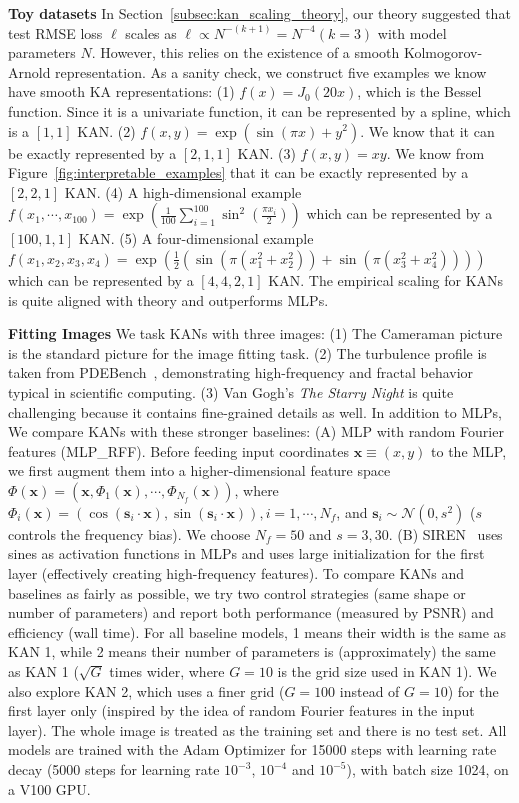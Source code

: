 \documentclass[12pt]{caltech_thesis}
\numberwithin{equation}{section}
\begin{document}
\textbf{Toy datasets} In Section~\ref{subsec:kan_scaling_theory}, our theory suggested that test RMSE loss $\ell$ scales as $\ell\propto N^{-(k+1)}=N^{-4} (k=3)$ with model parameters $N$. However, this relies on the existence of a smooth Kolmogorov-Arnold representation. As a sanity check, we construct five examples we know have smooth KA representations: (1) $f(x)=J_0(20x)$, which is the Bessel function. Since it is a univariate function, it can be represented by a spline, which is a $[1,1]$ KAN. (2) $f(x,y)={\exp}({\sin}(\pi x)+y^2)$. We know that it can be exactly represented by a $[2,1,1]$ KAN. (3) $f(x,y)=xy$. We know from Figure~\ref{fig:interpretable_examples} that it can be exactly represented by a $[2,2,1]$ KAN. (4) A high-dimensional example $f(x_1,\cdots,x_{100})={\exp}(\frac{1}{100}\sum_{i=1}^{100}{\sin}^2(\frac{\pi x_i}{2}))$ which can be represented by a $[100,1,1]$ KAN. (5) A four-dimensional example $f(x_1,x_2,x_3,x_4)={\exp}(\frac{1}{2}({\sin}(\pi(x_1^2+x_2^2))+{\sin}(\pi(x_3^2+x_4^2))))$ which can be represented by a $[4,4,2,1]$ KAN. The empirical scaling for KANs is quite aligned with theory and outperforms MLPs.

\textbf{Fitting Images} We task KANs with three images: (1) The Cameraman picture is the standard picture for the image fitting task. (2) The turbulence profile is taken from PDEBench~\cite{takamoto2022pdebench}, demonstrating high-frequency and fractal behavior typical in scientific computing. (3) Van Gogh's \textit{The Starry Night} is quite challenging because it contains fine-grained details as well. In addition to MLPs, We compare KANs with these stronger baselines: (A) MLP with random Fourier features (MLP\_RFF). Before feeding input coordinates $\mathbf{x}\equiv(x,y)$ to the MLP, we first augment them into a higher-dimensional feature space $\Phi(\mathbf{x})=(\mathbf{x},\Phi_1(\mathbf{x}),\cdots, \Phi_{N_f}(\mathbf{x}))$, where $\Phi_i(\mathbf{x})=({\cos}(\mathbf{s}_i\cdot \mathbf{x}), {\sin}(\mathbf{s}_i\cdot \mathbf{x})), i=1,\cdots, N_f$, and $\mathbf{s}_i\sim \mathcal{N}(0,s^2)$ ($s$ controls the frequency bias). We choose $N_f=50$ and $s=3, 30$. (B) SIREN~\citep{sitzmann2020implicit} uses sines as activation functions in MLPs and uses large initialization for the first layer (effectively creating high-frequency features). To compare KANs and baselines as fairly as possible, we try two control strategies (same shape or number of parameters) and report both performance (measured by PSNR) and efficiency (wall time). For all baseline models, 1 means their width is the same as KAN 1, while 2 means their number of parameters is (approximately) the same as KAN 1 ($\sqrt{G}$ times wider, where $G=10$ is the grid size used in KAN 1). We also explore KAN 2, which uses a finer grid ($G=100$ instead of $G=10$) for the first layer only (inspired by the idea of random Fourier features in the input layer). The whole image is treated as the training set and there is no test set. All models are trained with the Adam Optimizer for 15000 steps with learning rate decay (5000 steps for learning rate $10^{-3}$, $10^{-4}$ and $10^{-5}$), with batch size 1024, on a V100 GPU.
\end{document}
